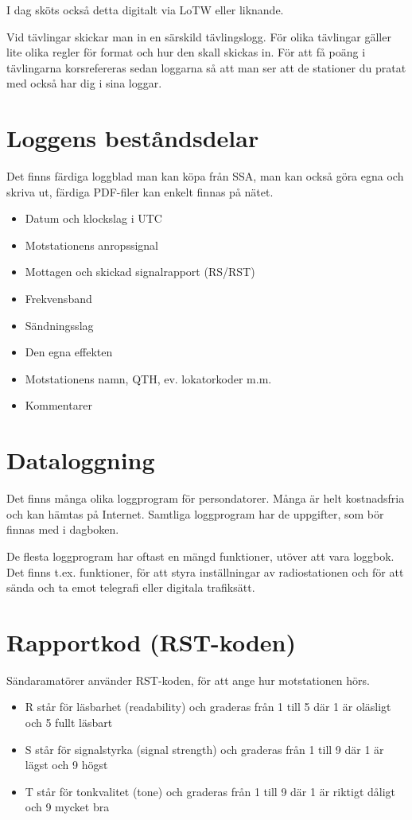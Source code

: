 I dag sköts också detta digitalt via LoTW eller liknande.

Vid tävlingar skickar man in en särskild tävlingslogg. För olika tävlingar gäller lite olika regler för format och hur den skall skickas in. För att få poäng i tävlingarna korsrefereras sedan loggarna så att man ser att de stationer du pratat med också har dig i sina loggar.

\section{Loggens beståndsdelar}

Det finns färdiga loggblad man kan köpa från SSA, man kan också göra egna och skriva ut, färdiga PDF-filer kan enkelt finnas på nätet.

\begin{itemize}
	\item Datum och klockslag i UTC
	\item Motstationens anropssignal
	\item Mottagen och skickad signalrapport (RS/RST)
	\item Frekvensband
	\item Sändningsslag
	\item Den egna effekten
	\item Motstationens namn, QTH, ev. lokatorkoder m.m.
	\item Kommentarer
\end{itemize}

\section{Dataloggning}

Det finns många olika loggprogram för
persondatorer. Många är helt kostnadsfria
och kan hämtas på Internet. Samtliga loggprogram har de uppgifter, som bör finnas med
i dagboken.

De flesta loggprogram har oftast en mängd
funktioner, utöver att vara loggbok. Det finns
t.ex. funktioner, för att styra inställningar av
radiostationen och för att sända och ta emot
telegrafi eller digitala trafiksätt.

\section{Rapportkod (RST-koden)}
Sändaramatörer använder RST-koden, för
att ange hur motstationen hörs.

\begin{itemize}
	\item R står för läsbarhet (readability) och
	graderas från 1 till 5 där 1 är oläsligt och 5 fullt läsbart
	\item S står för signalstyrka (signal strength)
	och graderas från 1 till 9 där 1 är lägst och 9 högst
	\item T står för tonkvalitet (tone) och graderas
	från 1 till 9 där 1 är riktigt dåligt och 9 mycket bra
\end{itemize}

